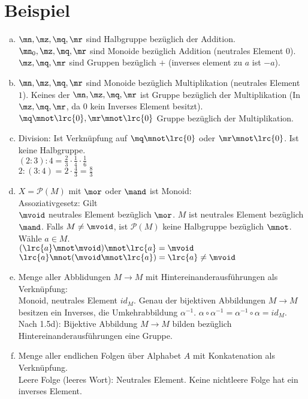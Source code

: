 	\section{Beispiel}

	\begin{enumerate}[a)]
		\item $\mn,\mz,\mq,\mr$ sind Halbgruppe bezüglich der Addition. $\mn_0,\mz,\mq,\mr$ sind Monoide bezüglich Addition (neutrales Element $0$).\\
		$\mz,\mq,\mr$ sind Gruppen bezüglich $+$ (inverses element zu $a$ ist $-a$).
		\item $\mn,\mz,\mq,\mr$ sind Monoide bezüglich Multiplikation (neutrales Element $1$). Keines der $\mn,\mz,\mq,\mr$ ist Gruppe bezüglich der Multiplikation (In $\mz,\mq,\mr$, da $0$ kein Inverses Element besitzt). $\mq\mnot\lrc{0},\mr\mnot\lrc{0}$ Gruppe bezüglich der Multiplikation.
		\item Division: Ist Verknüpfung auf $\mq\mnot\lrc{0}$ oder $\mr\mnot\lrc{0}$. Ist keine Halbgruppe.\\
		$(2:3):4=\frac{2}{3}\cdot\frac{1}{4}\cdot\frac{1}{6}$\\
		$2:(3:4)=2\cdot\frac{4}{3}=\frac{8}{3}$
		\item $X=\mathcal{P}(M)$ mit $\mor$ oder $\mand$ ist Monoid:\\
		Assoziativgesetz: Gilt\\
		$\mvoid$ neutrales Element bezüglich $\mor$. $M$ ist neutrales Element bezüglich $\mand$. Falls $M\neq\mvoid$, ist $\mathcal{P}(M)$ keine Halbgruppe bezüglich $\mnot$.\\
		Wähle $a\in M$.\\
		$(\lrc{a}\mnot\mvoid)\mnot\lrc{a}=\mvoid$\\
		$\lrc{a}\mnot(\mvoid\mnot\lrc{a})=\lrc{a}\neq\mvoid$
		\item Menge aller Abblidungen $M\rightarrow M$ mit Hintereinanderausführungen als Verknüpfung:\\
		Monoid, neutrales Element $id_M$. Genau der bijektiven Abbildungen $M\rightarrow M$ besitzen ein Inverses, die Umkehrabbildung $\alpha^{-1}$. $\alpha\circ\alpha^{-1}=\alpha^{-1}\circ\alpha=id_M$.\\
		Nach 1.5d): Bijektive Abbildung $M\rightarrow M$ bilden bezüglich Hintereinanderausführungen eine Gruppe.
		\item Menge aller endlichen Folgen über Alphabet $A$ mit Konkatenation als Verknüpfung.\\
		Leere Folge (leeres Wort): Neutrales Element. Keine nichtleere Folge hat ein inverses Element.

\end{enumerate}
